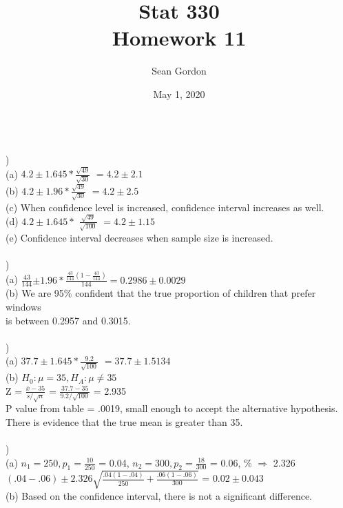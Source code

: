 \documentclass[12pt]{article}
\title{Stat 330\\Homework 11}
\author{Sean Gordon}
\date{May 1, 2020}
\begin{document}
\maketitle


\noindent\hrulefill \\


)\\
\indent (a) $4.2 \pm 1.645 * ${\Large $\frac{\sqrt{49}}{\sqrt{30}}$} $= 4.2 \pm 2.1$\\
\indent (b) $4.2 \pm 1.96 * ${\Large $\frac{\sqrt{49}}{\sqrt{30}}$} $= 4.2 \pm 2.5$\\
\indent (c) When confidence level is increased, confidence interval increases as well.\\
\indent (d) $4.2 \pm 1.645 *$ {\Large $\frac{\sqrt{49}}{\sqrt{100}}$} $= 4.2 \pm 1.15$\\
\indent (e) Confidence interval decreases when sample size is increased.\\


\noindent \hrulefill \\


)\\
\indent (a) {\Large $\frac{43}{144}$}$ \pm 1.96 * ${\Large $\frac{\frac{43}{144}(1 - \frac{43}{144})}{144}$}$ = 0.2986 \pm 0.0029$\\[.4em]
\indent (b) We are 95\% confident that the true proportion of children that prefer windows\\
\indent \indent is between 0.2957 and 0.3015.\\


\noindent \hrulefill \\


)  \\
\indent (a) $37.7 \pm 1.645 * ${\Large $\frac{9.2}{\sqrt{100}}$} $= 37.7 \pm 1.5134$\\
\indent (b) $H_0 : \mu = 35, H_A : \mu \ne 35$\\
\indent \indent Z = {\Large $\frac{\bar{x}-35}{s/\sqrt{n}}$ } = {\Large $\frac{37.7-35}{9.2/\sqrt{100}}$ } = 2.935\\
\indent \indent P value from table = .0019, small enough to accept the alternative hypothesis.\\
\indent \indent There is evidence that the true mean is greater than 35.\\


\noindent \hrulefill \\


)\\
\indent (a) $n_1 = 250, p_1 = ${\Large $\frac{10}{250}$} = 0.04, \indent $n_2 = 300, p_2 = ${\Large $\frac{18}{300}$} = 0.06, \% $\Rightarrow$ 2.326\\
\indent \indent $(.04 - .06) \pm 2.326${\Large $\sqrt{\frac{.04(1-.04)}{250} + \frac{.06(1-.06)}{300}}$} = $0.02 \pm 0.043$\\
\indent (b) Based on the confidence interval, there is not a significant difference.\\
\end{document}
